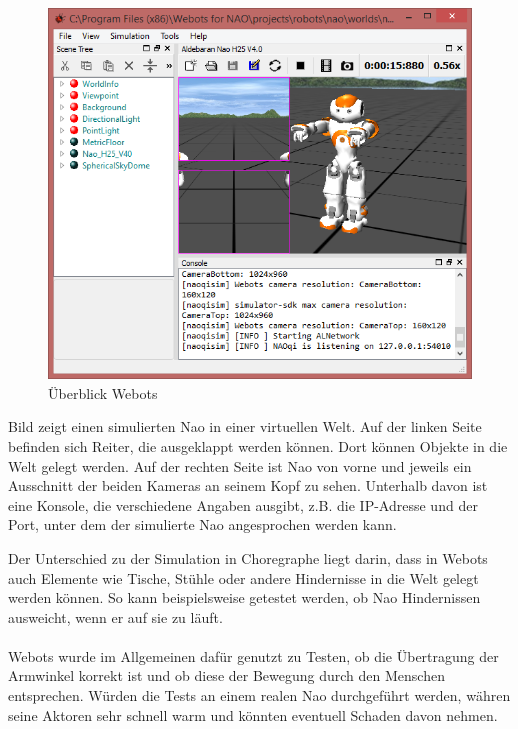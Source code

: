 \begin{figure}[H]						
	\centering							
	\includegraphics[scale=0.7]{Bilder/webots.png}			
	\caption{Überblick Webots}						
	\label{f:nao_webots}						
\end{figure}
\noindent
Bild  zeigt einen simulierten Nao in einer virtuellen Welt. Auf der linken Seite befinden sich Reiter, die ausgeklappt werden können. Dort können Objekte in die Welt gelegt werden. Auf der rechten Seite ist Nao von vorne und jeweils ein Ausschnitt der beiden Kameras an seinem Kopf zu sehen. Unterhalb davon ist eine Konsole, die verschiedene Angaben ausgibt, z.B. die IP-Adresse und der Port, unter dem der simulierte Nao angesprochen werden kann.

Der Unterschied zu der Simulation in Choregraphe liegt darin, dass in Webots auch Elemente wie Tische, Stühle oder andere Hindernisse in die Welt gelegt werden können. So kann beispielsweise getestet werden, ob Nao Hindernissen ausweicht, wenn er auf sie zu läuft.
\\
\\
Webots wurde im Allgemeinen dafür genutzt zu Testen, ob die Übertragung der Armwinkel korrekt ist und ob diese der Bewegung durch den Menschen entsprechen. Würden die Tests an einem realen Nao durchgeführt werden, währen seine Aktoren sehr schnell warm und könnten eventuell Schaden davon nehmen.





